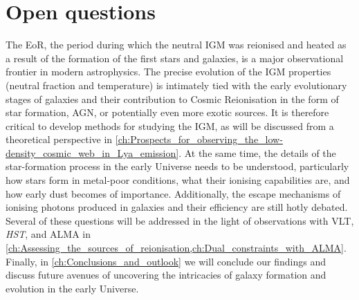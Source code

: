 \section{Open questions}

The EoR, the period during which the neutral IGM was reionised and heated as a result of the formation of the first stars and galaxies, is a major observational frontier in modern astrophysics. The precise evolution of the IGM properties (neutral fraction and temperature) is intimately tied with the early evolutionary stages of galaxies and their contribution to Cosmic Reionisation in the form of star formation, AGN, or potentially even more exotic sources. It is therefore critical to develop methods for studying the IGM, as will be discussed from a theoretical perspective in \cref{ch:Prospects_for_observing_the_low-density_cosmic_web_in_Lya_emission}. At the same time, the details of the star-formation process in the early Universe needs to be understood, particularly how stars form in metal-poor conditions, what their ionising capabilities are, and how early dust becomes of importance. Additionally, the escape mechanisms of ionising photons produced in galaxies and their efficiency are still hotly debated. Several of these questions will be addressed in the light of observations with VLT, \textit{HST}, and ALMA in \cref{ch:Assessing_the_sources_of_reionisation,ch:Dual_constraints_with_ALMA}. Finally, in \cref{ch:Conclusions_and_outlook} we will conclude our findings and discuss future avenues of uncovering the intricacies of galaxy formation and evolution in the early Universe.